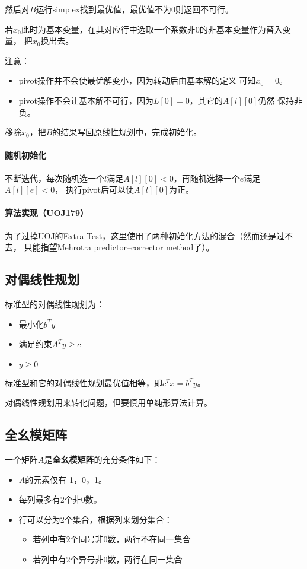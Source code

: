 然后对$B$运行simplex找到最优值，最优值不为0则返回不可行。

若$x_0$此时为基本变量，在其对应行中选取一个系数非0的非基本变量作为替入变量，
把$x_0$换出去。

注意：
\begin{itemize}
    \item pivot操作并不会使最优解变小，因为转动后由基本解的定义
    可知$x_0=0$。
    \item pivot操作不会让基本解不可行，因为$L[0]=0$，其它的$A[i][0]$仍然
    保持非负。
\end{itemize}

移除$x_0$，把$B$的结果写回原线性规划中，完成初始化。
\paragraph{随机初始化}
不断迭代，每次随机选一个$l$满足$A[l][0]<0$，再随机选择一个$e$满足$A[l][e]<0$，
执行pivot后可以使$A[l][0]$为正。
\paragraph{算法实现（UOJ179）}
为了过掉UOJ的Extra Test，这里使用了两种初始化方法的混合（然而还是过不去，
只能指望Mehrotra predictor–corrector method了）。

\subsection{对偶线性规划}
标准型的对偶线性规划为：
\begin{itemize}
    \item 最小化$b^Ty$
    \item 满足约束$A^Ty\geq c$
    \item $y\geq 0$
\end{itemize}

标准型和它的对偶线性规划最优值相等，即$c^Tx=b^Ty$。

对偶线性规划用来转化问题，但要慎用单纯形算法计算。
\subsection{全幺模矩阵}

一个矩阵$A$是{\bfseries 全幺模矩阵}的充分条件如下：
\begin{itemize}
    \item $A$的元素仅有-1，0，1。
    \item 每列最多有2个非0数。
    \item 行可以分为2个集合，根据列来划分集合：
    \begin{itemize}
        \item 若列中有2个同号非0数，两行不在同一集合
        \item 若列中有2个异号非0数，两行在同一集合
    \end{itemize}
\end{itemize}

